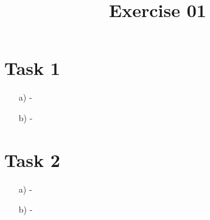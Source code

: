\documentclass[a4paper]{article}
\date{}
\author{}
\title{\textbf{Exercise 01}}
\begin{document}
	\maketitle 
	\thispagestyle{fancy}
	
    \section*{Task 1}
    \begin{itemize}
    \item[a)] - 
    \item[b)] -
    \end{itemize}
    
    \section*{Task 2}
        \begin{itemize}
    \item[a)] -
    \item[b)] -
    \end{itemize}

    
\end{document}
